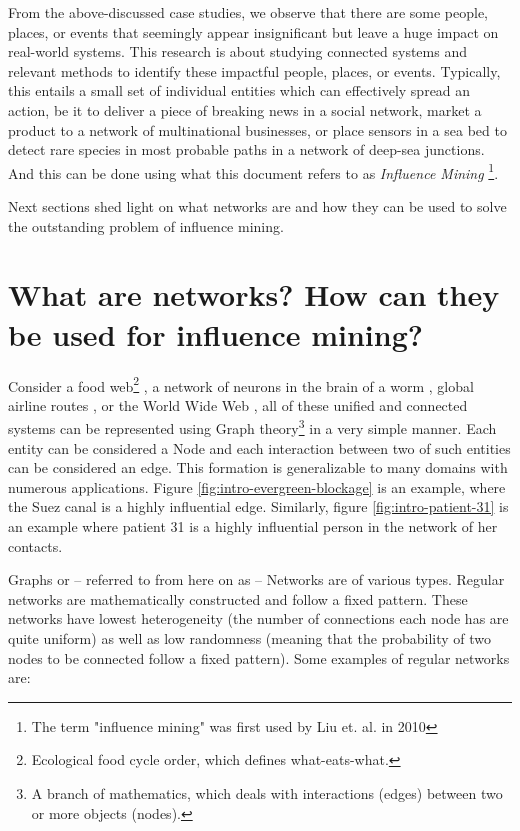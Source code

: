 From the above-discussed case studies, we observe that there are some people, places, or events that seemingly appear insignificant but leave a huge impact on real-world systems. This research is about studying connected systems and relevant methods to identify these impactful people, places, or events. Typically, this entails a small set of individual entities which can effectively spread an action, be it to deliver a piece of breaking news in a social network, market a product to a network of multinational businesses, or place sensors in a sea bed to detect rare species in most probable paths in a network of deep-sea junctions. And this can be done using what this document refers to as \textit{Influence Mining} \footnote{The term "influence mining" was first used by Liu et. al. in 2010\cite{liu2010}}.

Next sections shed light on what networks are and how they can be used to solve the outstanding problem of influence mining.

	\section{What are networks? How can they be used for influence mining?}
	\label{sec:intro-networks}
	Consider a food web\footnote{Ecological food cycle order, which defines what-eats-what.} \cite{cohen1990}, a network of neurons in the brain of a worm \cite{achacoso1991}, global airline routes \cite{guimera2005}, or the World Wide Web \cite{www2015}, all of these unified and connected systems can be represented using Graph theory\footnote{A branch of mathematics, which deals with interactions (edges) between two or more objects (nodes).} in a very simple manner. Each entity can be considered a Node and each interaction between two of such entities can be considered an edge. This formation is generalizable to many domains with numerous applications. Figure \ref{fig:intro-evergreen-blockage} is an example, where the Suez canal is a highly influential edge. Similarly, figure \ref{fig:intro-patient-31} is an example where patient 31 is a highly influential person in the network of her contacts.
	
	Graphs or -- referred to from here on as -- Networks are of various types. Regular networks are mathematically constructed and follow a fixed pattern. These networks have lowest heterogeneity (the number of connections each node has are quite uniform) as well as low randomness (meaning that the probability of two nodes to be connected follow a fixed pattern). Some examples of regular networks are:
	
